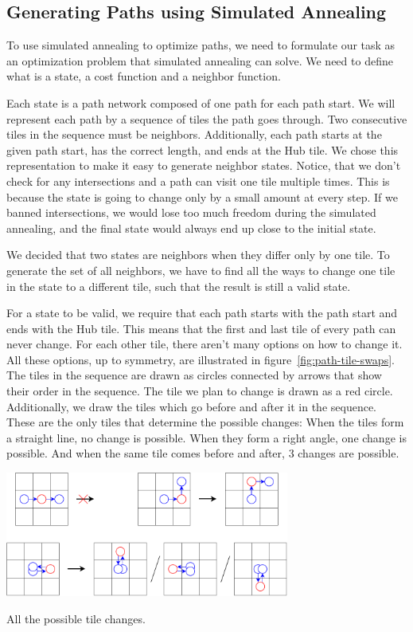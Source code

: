 \subsection{Generating Paths using Simulated Annealing}\label{sec:analysis-our-simulated-annealing}

To use simulated annealing to optimize paths, we need to formulate our task as an optimization problem that simulated annealing can solve.
We need to define what is a state, a cost function and a neighbor function.

Each state is a path network composed of one path for each path start.
We will represent each path by a sequence of tiles the path goes through.
Two consecutive tiles in the sequence must be neighbors.
Additionally, each path starts at the given path start, has the correct length, and ends at the Hub tile.
We chose this representation to make it easy to generate neighbor states.
Notice, that we don't check for any intersections and a path can visit one tile multiple times.
This is because the state is going to change only by a small amount at every step.
If we banned intersections, we would lose too much freedom during the simulated annealing, and the final state would always end up close to the initial state.

We decided that two states are neighbors when they differ only by one tile.
To generate the set of all neighbors, we have to find all the ways to change one tile in the state to a different tile, such that the result is still a valid state.

For a state to be valid, we require that each path starts with the path start and ends with the Hub tile.
This means that the first and last tile of every path can never change.
For each other tile, there aren't many options on how to change it.
All these options, up to symmetry, are illustrated in figure~\ref{fig:path-tile-swaps}.
The tiles in the sequence are drawn as circles connected by arrows that show their order in the sequence.
The tile we plan to change is drawn as a red circle.
Additionally, we draw the tiles which go before and after it in the sequence.
These are the only tiles that determine the possible changes:
When the tiles form a straight line, no change is possible.
When they form a right angle, one change is possible.
And when the same tile comes before and after, 3 changes are possible.

\begin{center}
    \captionsetup{type=figure}
    \includegraphics[width=0.7\textwidth]{img/SA tile swaps.pdf}
    \caption{All the possible tile changes.}
    \label{fig:path-tile-swaps}
\end{center}


